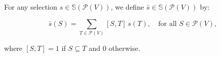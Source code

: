 For any selection $s \in \mathbb{S}(\mathcal{P}(V))$, we define $\bar{s} \in \mathbb{S}(\mathcal{P}(V))$ by:

$$\bar{s}(S) = \sum_{T \in \mathcal{P}(V)} [S, T]\, s(T), \quad \text{for all } S \in \mathcal{P}(V),$$

where $[S, T] = 1$ if $S \subseteq T$ and $0$ otherwise.
